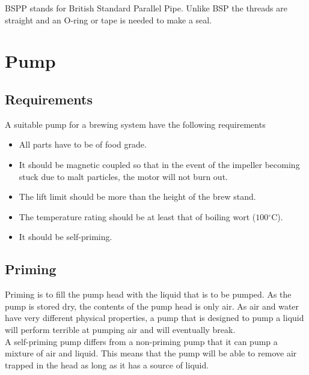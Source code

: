 \documentclass[11pt,fleqn,openany]{book} %
\newcommand{\degree}{\ensuremath{^\circ}}
\begin{document}
BSPP stands for British Standard Parallel Pipe. Unlike BSP the threads are straight and an O-ring or tape is needed to make a seal.



\chapter{Pump}

\section{Requirements}

A suitable pump for a brewing system have the following requirements

\begin{itemize}
\item All parts have to be of food grade.
\item It should be magnetic coupled so that in the event of the impeller becoming stuck due to malt particles, the motor will not burn out.
\item The lift limit should be more than the height of the brew stand.
\item The temperature rating should be at least that of boiling wort ($100\degree$C).
\item It should be self-priming.
\end{itemize}

\section{Priming}

Priming is to fill the pump head with the liquid that is to be pumped. As the pump is stored dry, the contents of the pump head is only air. As air and water have very different physical properties, a pump that is designed to pump a liquid will perform terrible at pumping air and will eventually break.\\

A self-priming pump differs from a non-priming pump that it can pump a mixture of air and liquid. This means that the pump will be able to remove air trapped in the head as long as it has a source of liquid.\\
\end{document}
